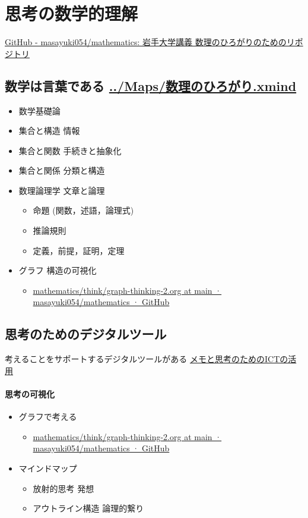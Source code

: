 \documentclass[dvipdfmx,11pat]{jarticle}
\begin{document}
\section{思考の数学的理解}
\label{sec:orgd7e6805}
\href{https://github.com/masayuki054/mathematics/tree/main}{GitHub - masayuki054/mathematics: 岩手大学講義 数理のひろがりのためのリポジトリ}
\subsection{数学は言葉である \url{../Maps/数理のひろがり.xmind}}
\label{sec:org89d1d34}
\begin{itemize}
\item 数学基礎論
\item 集合と構造 情報
\item 集合と関数 手続きと抽象化
\item 集合と関係 分類と構造
\item 数理論理学 文章と論理
\begin{itemize}
\item 命題 (関数，述語，論理式)
\item 推論規則
\item 定義，前提，証明，定理
\end{itemize}
\item グラフ 構造の可視化
\begin{itemize}
\item \href{https://github.com/masayuki054/mathematics/blob/main/think/graph-thinking-2.org}{mathematics/think/graph-thinking-2.org at main · masayuki054/mathematics · GitHub}
\end{itemize}
\end{itemize}
\subsection{思考のためのデジタルツール}
\label{sec:org4d6730c}
考えることをサポートするデジタルツールがある \href{https://masayuki054.github.io/ict\_literacy\_for\_thinking\_and\_memo/}{メモと思考のためのICTの活用}
\paragraph{思考の可視化}
\label{sec:org0d4189a}
\begin{itemize}
\item グラフで考える
\begin{itemize}
\item \href{https://github.com/masayuki054/mathematics/blob/main/think/graph-thinking-2.org}{mathematics/think/graph-thinking-2.org at main · masayuki054/mathematics · GitHub}
\end{itemize}
\item マインドマップ
\begin{itemize}
\item 放射的思考 発想
\item アウトライン構造 論理的繋り
\end{itemize}
\end{itemize}
\end{document}
